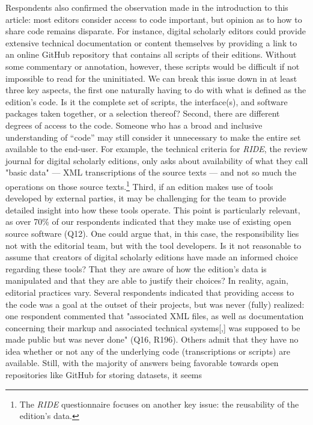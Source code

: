 \begin{paper}
Respondents also confirmed the observation made in the introduction to
this article: most editors consider access to code important, but
opinion as to how to share code remains disparate. For instance, digital
scholarly editors could provide extensive technical documentation or
content themselves by providing a link to an online GitHub repository
that contains all scripts of their editions. Without some commentary or
annotation, however, these scripts would be difficult if not impossible
to read for the uninitiated. We can break this issue down in at least
three key aspects, the first one naturally having to do with what is
defined as the edition's code. Is it the complete set of scripts, the
interface(s), and software packages taken together, or a selection
thereof? Second, there are different degrees of access to the code.
Someone who has a broad and inclusive understanding of ``code'' may
still consider it unnecessary to make the entire set available to the
end-user. For example, the technical criteria for \emph{RIDE}, the
review journal for digital scholarly editions, only asks about
availability of what they call "basic data" --- XML transcriptions of the
source texts --- and not so much the operations on those source
texts.\footnote{The \emph{RIDE} questionnaire focuses on another key
  issue: the reusability of the edition's data.} Third, if an edition
makes use of tools developed by external parties, it may be challenging
for the team to provide detailed insight into how these tools operate.
This point is particularly relevant, as over 70\% of our respondents
indicated that they make use of existing open source software (Q12). One
could argue that, in this case, the responsibility lies not with the
editorial team, but with the tool developers. Is it not reasonable to
assume that creators of digital scholarly editions have made an informed
choice regarding these tools? That they are aware of how the edition's
data is manipulated and that they are able to justify their choices? In
reality, again, editorial practices vary. Several respondents indicated
that providing access to the code was a goal at the outset of their
projects, but was never (fully) realized: one respondent commented that
"associated XML files, as well as documentation concerning their markup
and associated technical systems{[},{]} was supposed to be made public
but was never done" (Q16, R196). Others admit that they have no idea
whether or not any of the underlying code (transcriptions or scripts)
are available. Still, with the majority of answers being favorable
towards open repositories like GitHub for storing datasets, it seems

\end{paper}

